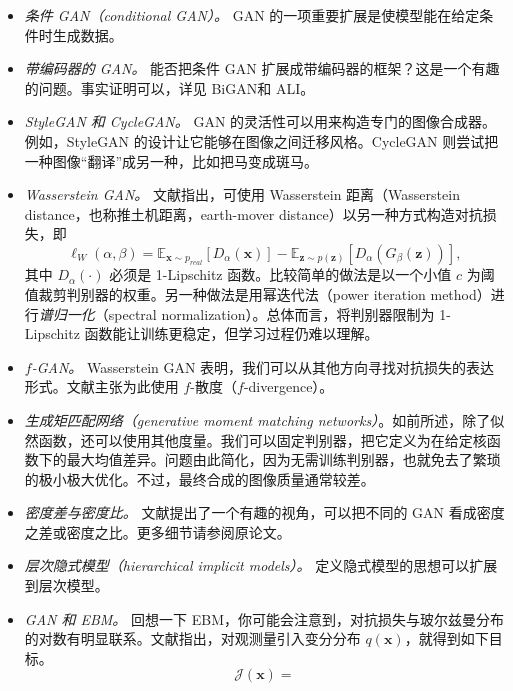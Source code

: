 \begin{itemize}
  \item \emph{条件 GAN（conditional GAN）。} GAN 的一项重要扩展是使模型能在给定条件时生成数据。
  \item \emph{带编码器的 GAN。} 能否把条件 GAN 扩展成带编码器的框架？这是一个有趣的问题。事实证明可以，详见 BiGAN和 ALI。
  \item \emph{StyleGAN 和 CycleGAN。} GAN 的灵活性可以用来构造专门的图像合成器。例如，StyleGAN 的设计让它能够在图像之间迁移风格。CycleGAN 则尝试把一种图像“翻译”成另一种，比如把马变成斑马。
  \item \emph{Wasserstein GAN。} 文献指出，可使用 Wasserstein 距离（Wasserstein distance，也称推土机距离，earth-mover distance）以另一种方式构造对抗损失，即
  \begin{equation}
    \ell_W(\alpha,\beta)=
    \mathbb E_{\mathbf x\sim p_{\mathit{real}}}[D_\alpha(\mathbf x)]
    -\mathbb E_{\mathbf z\sim p(\mathbf z)}[D_\alpha(G_\beta(\mathbf z))],
    \tag{8.10}\label{eq:08-10}
  \end{equation}
  其中 $D_\alpha(\cdot)$ 必须是 1-Lipschitz 函数。比较简单的做法是以一个小值 $c$ 为阈值裁剪判别器的权重。另一种做法是用幂迭代法（power iteration method）进行\emph{谱归一化}（spectral normalization）。总体而言，将判别器限制为 1-Lipschitz 函数能让训练更稳定，但学习过程仍难以理解。
  \item \emph{$f$-GAN。} Wasserstein GAN 表明，我们可以从其他方向寻找对抗损失的表达形式。文献主张为此使用 $f$-散度（$f$-divergence）。
  \item \emph{生成矩匹配网络（generative moment matching networks）}。如前所述，除了似然函数，还可以使用其他度量。我们可以固定判别器，把它定义为在给定核函数下的最大均值差异。问题由此简化，因为无需训练判别器，也就免去了繁琐的极小极大优化。不过，最终合成的图像质量通常较差。
  \item \emph{密度差与密度比。} 文献提出了一个有趣的视角，可以把不同的 GAN 看成密度之差或密度之比。更多细节请参阅原论文。
  \item \emph{层次隐式模型（hierarchical implicit models）。} 定义隐式模型的思想可以扩展到层次模型。
  \item \emph{GAN 和 EBM。} 回想一下 EBM，你可能会注意到，对抗损失与玻尔兹曼分布的对数有明显联系。文献指出，对观测量引入变分分布 $q(\mathbf x)$，就得到如下目标。
  \begin{equation}
    \mathcal J(\mathbf x)=

\end{equation}
\end{itemize}

